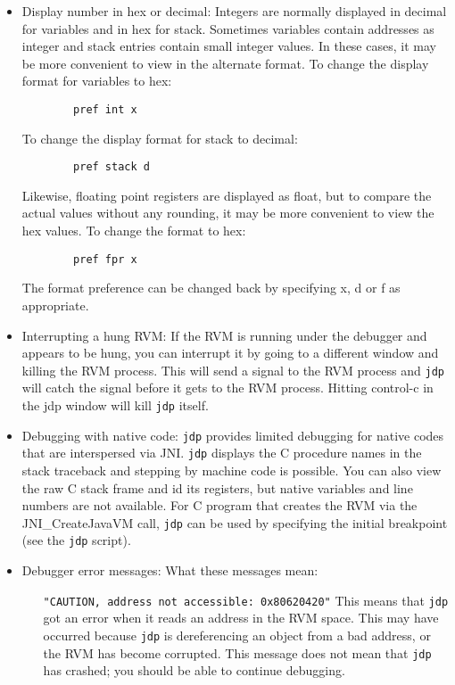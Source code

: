\begin{itemize}
\item Display number in hex or decimal:
  Integers are normally displayed in decimal for variables and
  in hex for stack.  Sometimes variables contain addresses as 
  integer and stack entries contain small integer values.    In
  these cases, it may be more convenient to view in the alternate
  format.
  To change the display format for variables to hex:
\begin{verbatim}
        pref int x
\end{verbatim}
  To change the display format for stack to decimal:
\begin{verbatim}
        pref stack d
\end{verbatim}
  Likewise, floating point registers are displayed as float, but
  to compare the actual values without any rounding, it may be more
  convenient to view the hex values.  To change the format to hex:
\begin{verbatim}
        pref fpr x
\end{verbatim}

  The format preference can be changed back by specifying x, d or f
  as appropriate.

\item Interrupting a hung RVM:  If the RVM is running under the debugger
  and appears to be hung, you can interrupt it by going to a different
  window and killing the RVM process.  This will send a signal to the
  RVM process and {\tt jdp} will catch the signal before it gets to
  the RVM process.  Hitting control-c in the jdp window will kill 
  {\tt jdp} itself.


\item Debugging with native code:  {\tt jdp} provides limited debugging
  for native codes that are interspersed via JNI.  {\tt jdp}
  displays the C procedure names in the stack traceback and stepping by 
  machine code is possible.  You can also view the raw C stack frame and 
id  its registers, but native variables and line numbers are not available.
  For C program that creates the RVM via the JNI\_CreateJavaVM call, 
  {\tt jdp} can be used by specifying the initial breakpoint (see the 
  {\tt jdp} script).




\item Debugger error messages:
  What these messages mean:

\begin{itemize}
\item [{\tt "CAUTION, address not accessible: 0x80620420"}]
        This means that {\tt jdp} got an error when it reads an address
        in the RVM space.  This may have occurred because {\tt jdp} is 
        dereferencing an object from a bad address, or the RVM has
        become corrupted.  This message does not mean that {\tt jdp}
        has crashed; you should be able to continue debugging.


\end{itemize}
\end{itemize}
